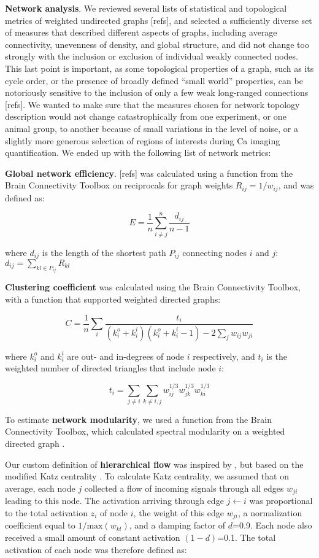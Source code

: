 \documentclass{article}
\begin{document}
\textbf{Network analysis}. We reviewed several lists of statistical and topological metrics of weighted undirected graphs [refs], and selected a sufficiently diverse set of measures that described different aspects of graphs, including average connectivity, unevenness of density, and global structure, and did not change too strongly with the inclusion or exclusion of individual weakly connected nodes. This last point is important, as some topological properties of a graph, such as its cycle order, or the presence of broadly defined “small world” properties, can be notoriously sensitive to the inclusion of only a few weak long-ranged connections [refs]. We wanted to make sure that the measures chosen for network topology description would not change catastrophically from one experiment, or one animal group, to another because of small variations in the level of noise, or a slightly more generous selection of regions of interests during Ca imaging quantification. We ended up with the following list of network metrics:

\textbf{Global network efficiency}. [refs] was calculated using a function from the Brain Connectivity Toolbox \citep{rubinov2010toolbox} on reciprocals for graph weights $R_{ij} = 1/w_{ij}$, and was defined as:

\[ E = \frac{1}{n} \sum_{i \neq j}^n{\frac{d_{ij}}{n-1}} \]

where $d_{ij}$ is the length of the shortest path $P_{ij}$ connecting nodes $i$ and $j$: $d_{ij} = \sum_{kl \in P_{ij}}{R_{kl}}$

\textbf{Clustering coefficient} \citep{fagiolo2007} was calculated using the Brain Connectivity Toolbox, with a function that supported weighted directed graphs:

\[ C = \frac{1}{n} \sum_i{\frac {t_i}{(k^o_i+k^i_i)(k^o_i+k^i_i-1)-2\sum_j{w_{ij}w_{ji}}}} \]

where $k^o_i$ and $k^i_i$ are out- and in-degrees of node $i$ respectively, and $t_i$ is the weighted number of directed triangles that include node $i$:

\[ t_i = \sum_{j \neq i}{\sum_{k \neq i,j}{w^{1/3}_{ij}w^{1/3}_{jk}w^{1/3}_{ki}}} \]

To estimate \textbf{network modularity}, we used a function from the Brain Connectivity Toolbox, which calculated spectral modularity on a weighted directed graph \citep{reichardt2006community,leicht2008community}.

Our custom definition of \textbf{hierarchical flow} was inspired by \citep{mones2012hierarchy,czegel2015hierarchy}, but based on the modified Katz centrality \citep{katz1953original,fletcher2018katz}. To calculate Katz centrality, we assumed that on average, each node $j$ collected a flow of incoming signals through all edges $w_{ji}$ leading to this node. The activation arriving through edge $j\leftarrow i$ was proportional to the total activation $z_i$ of node $i$, the weight of this edge $w_{ji}$, a normalization coefficient equal to $1/\text{max}(w_{kl})$, and a damping factor of $d$=0.9. Each node also received a small amount of constant activation $(1-d)$=0.1. The total activation of each node was therefore defined as:
\end{document}
